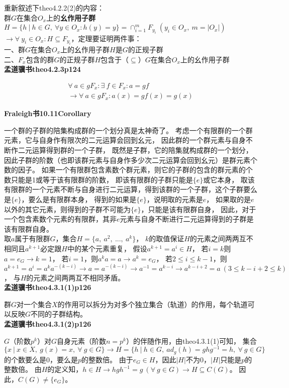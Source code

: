 \noindent 重新叙述下theo4.2.2(2)的内容：\\
群$G$在集合$O_{x}$上的\textbf{幺作用子群}$H=\{h\ |\ h\in G,\ \forall y\in O_{x}:h(y)=y\}=\cap_{i=1}^{m} F_{y_{i}}\ (y_{i}\in O_{x},\ m=|O_{x}|)$
$\rightarrow \forall\ y_{i}\in O_{x}:H\subseteq F_{y_{i}}$，定理要证明两件事：\\
一、群$G$在集合$O_{x}$上的幺作用子群$H$是$G$的正规子群\\
二、$F_{x}$包含的群$G$的正规子群$H$包含于（$\subseteq$）$G$在集合$O_{x}$上的幺作用子群\\

\textbf{孟道骥书\cite{meng2010}theo4.2.3p124}

\begin{gather}
    \forall\ a \in gF_{x}:\exists\ f\in F_{x}:a=gf\\
    \rightarrow \forall\ a \in gF_{x}:a(x)=gf(x)=g(x)
\end{gather}

\textbf{Fraleigh书\cite{Fraleigh2002}10.11Corollary}

一个群的子群的陪集构成群的一个划分真是太神奇了。
考虑一个有限群的一个群元素，它与自身作有限次的二元运算会回到幺元，
因此群的一个群元素与自身不断作二元运算得到群的一个子群，
既然是子群，它的陪集就构成群的一个划分，
因此子群的阶数（也即该群元素与自身作多少次二元运算会回到幺元）是群元素个数的因子。
如果一个有限群包含素数个群元素，则它的子群的包含的群元素的个数只能是1或等于该有限群的阶数，
即该有限群的子群只能是$\{e\}$或它本身，
取该有限群的一个元素不断与自身进行二元运算，得到该群的一个子群，这个子群要么是$\{e\}$，要么是有限群本身，
得到的如果是$\{e\}$，说明取的元素是$e$，
如果取的是$e$以外的其它元素，则得到的子群不可能为$\{e\}$，只能是该有限群自身，
因此，对于一个包含素数个元素的有限群，其非$e$元素与自身不断进行二元运算得到的子群是该有限群自身。\\

取$a$属于有限群$G$，集合$H=\{a,\ a^{2},\ ...,\ a^{k}\}$，
$k$的取值保证$H$的元素之间两两互不相同且$a^{k+1}$必定跟$H$中的某个元素重复，
假设$a^{k+1}=a^{i}\in H$，
若$i=k$则$a=e_{G}\rightarrow k=1$，
若$i=1$，则$a^{k}a=a\rightarrow a^{k}=e_{G}$，
若$2\leq i\leq k-1$，则$a^{k+1}=a^{i}=a^{k}a^{-(k-i)}\rightarrow a=a^{-(k-i)}\rightarrow a^{-1}=a^{k-i}\rightarrow a^{k-i+2}=a\ (3\leq k-i+2\leq k)$，
与$H$的元素之间两两互不相同矛盾。\\

\textbf{孟道骥书\cite{meng2010}theo4.3.1(1)p126}

群$G$对一个集合$X$的作用可以拆分为对多个独立集合（轨道）的作用，每个轨道可以反映$G$不同的子群结构。\\

\textbf{孟道骥书\cite{meng2010}theo4.3.1(2)p126}

$G$（阶数$p^{k}$）对$G$自身元素（阶数$n=p^{k}$）的伴随作用，由theo4.3.1(1)可知，
集合$\{x\ |\ x\in X,\ g(x)=x,\ \forall\ g\in G\}\rightarrow H=\{h\ |\ h\in G,\ ad_{g}(h)=ghg^{-1}=h,\ \forall\ g\in G\}$的个数要么是0，要么是$p$的整数倍。
由于$e_{G}\in H$，因此$|H|$不为0，$|H|$只能是$p$的整数倍。
由$H$的定义知，$h\in H\rightarrow hgh^{-1}=g\ (\forall\ g\in G)\rightarrow H\subseteq C(G)$。
因此，$C(G)\neq \{e_{G}\}$。\\



